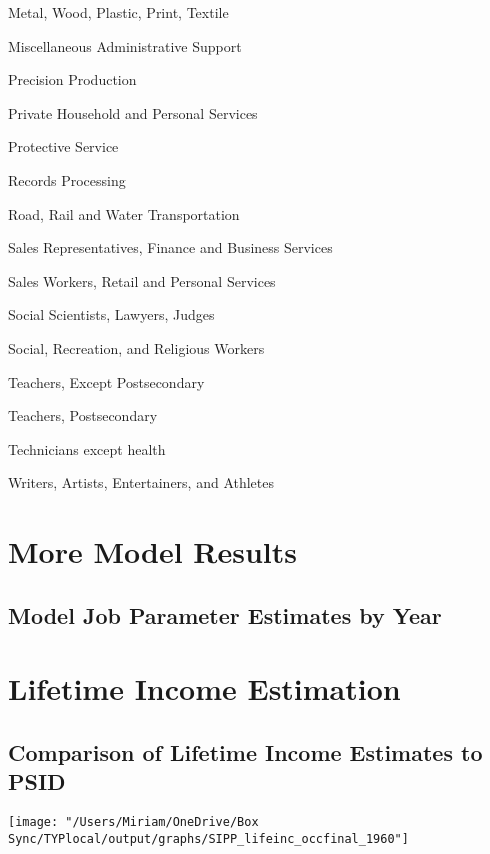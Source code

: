 \documentclass[11pt]{article}
\begin{document}
   Metal, Wood, Plastic, Print, Textile
   
   Miscellaneous Administrative Support
   
   Precision Production
   
   Private Household and Personal Services
   
   Protective Service
   
   Records Processing
   
   Road, Rail and Water Transportation
   
   Sales Representatives, Finance and Business Services
   
   Sales Workers, Retail and Personal Services
   
   Social Scientists, Lawyers, Judges
   
   Social, Recreation, and Religious Workers
   
   Teachers, Except Postsecondary
   
   Teachers, Postsecondary
   
   Technicians except health
   
   Writers, Artists, Entertainers, and Athletes
   
\newpage

\section{More Model Results} \label{modelresults}
\subsection{Model Job Parameter Estimates by Year}

\clearpage

\clearpage

\clearpage

\clearpage

\clearpage


\section{Lifetime Income Estimation}
\subsection{Comparison of Lifetime Income Estimates to PSID}

\texttt{[image: "/Users/Miriam/OneDrive/Box Sync/TYPlocal/output/graphs/SIPP\_lifeinc\_occfinal\_1960"]}
\end{document}
